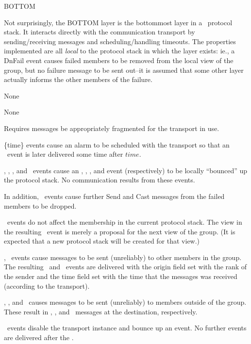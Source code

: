\begin{Layer}{BOTTOM} 

Not surprisingly, the BOTTOM layer is the bottommost layer in a \ensemble\
protocol stack.  It interacts directly with the communication transport by
sending/receiving messages and scheduling/handling timeouts.  The properties
implemented are all \emph{local} to the protocol stack in which the layer
exists: ie., a DnFail event causes failed members to be removed from the local
view of the group, but no failure message to be sent out--it is assumed that
some other layer actually informs the other members of the failure.

\begin{Protocol}
None
\end{Protocol}

\begin{Parameters}
\item None
\end{Parameters}

\begin{Properties}
\item
Requires messages be appropriately fragmented for the transport in use.
\item
\DnTimer\{time\} events cause an alarm to be scheduled with the transport so
that an \UpTimer\ event is later delivered some time after $time$.
\item
\DnBlock, \DnView, \DnStable, and \DnFail\ events cause an \UpBlock,
\UpView, \UpStable, and \UpFail event (respectively) to be locally
``bounced'' up the protocol stack.  No communication results from these
events.
\item
In addition, \DnFail\ events cause further Send and Cast messages from the
failed members to be dropped.
\item
\DnView\ events do not affect the membership in the current protocol stack.
The view in the resulting \UpView\ event is merely a proposal for the next
view of the group.  (It is expected that a new protocol stack will be
created for that view.)
\item
\DnSend, \DnCast\ events cause messages to be sent (unreliably) to other
members in the group.  The resulting \UpSend\ and \UpCast\ events are delivered
with the origin field set with the rank of the sender and the time field
set with the time that the messages was received (according to the
transport).
\item
\DnMerge, \DnMergeDenied, and \DnMergeGranted\ causes messages to be sent
(unreliably) to members outside of the group.  These result in
\UpMergeRequest, \UpMergeDenied, and \UpMergeGranted\ messages at the
destination, respectively.
\item
\DnLeave\ events disable the transport instance and bounce up an \UpExit
event.  No further events are delivered after the \UpExit. \note{currently,
this may not be true}
\end{Properties}


\end{Layer}
